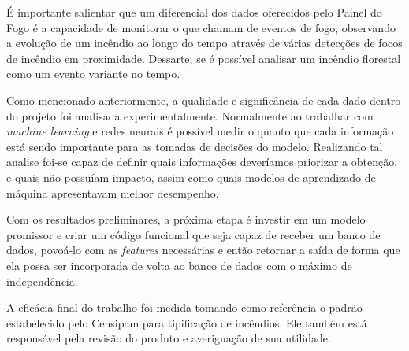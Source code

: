 É importante salientar que um diferencial dos dados oferecidos pelo Painel do Fogo é a capacidade de monitorar o que chamam de eventos de fogo, observando a evolução de um incêndio ao longo do tempo através de várias detecções de focos de incêndio em proximidade. Dessarte, se é possível analisar um incêndio florestal como um evento variante no tempo.


Como mencionado anteriormente, a qualidade e significância de cada dado dentro do projeto foi analisada experimentalmente. Normalmente ao trabalhar com \textit{machine learning} e redes neurais é possível medir o quanto que cada informação está sendo importante para as tomadas de decisões do modelo. Realizando tal analise foi-se capaz de definir quais informações deveríamos priorizar a obtenção, e quais não possuíam impacto, assim como quais modelos de aprendizado de máquina apresentavam melhor desempenho.

Com os resultados preliminares, a próxima etapa é investir em um modelo promissor e criar um código funcional que seja capaz de receber um banco de dados, povoá-lo com as \textit{features} necessárias e então retornar a saída de forma que ela possa ser incorporada de volta ao banco de dados com o máximo de independência.

A eficácia final do trabalho foi medida tomando como referência o padrão estabelecido pelo Censipam para tipificação de incêndios. Ele também está responsável pela revisão do produto e averiguação de sua utilidade.